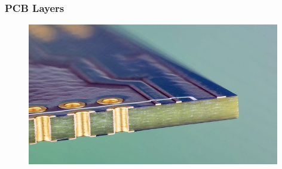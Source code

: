 \documentclass[aspectratio=169, t]{beamer}
\begin{document}
\begin{frame}
	\frametitle{PCB Layers}
	\vspace{-2mm}
	\begin{figure}
			\includegraphics[width=11cm]{images/esml_2_layer.jpeg}
	\end{figure}
	\centering
\end{frame}
\end{document}
